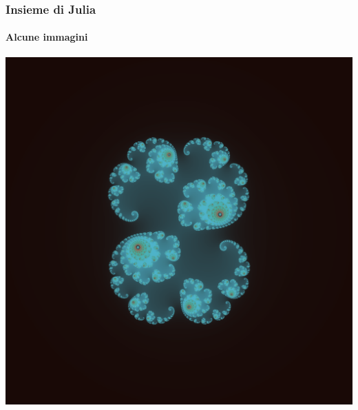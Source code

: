 \documentclass{beamer}
\begin{document}
			\begin{frame}
				\frametitle{Insieme di Julia}
				\framesubtitle{Alcune immagini}
				\begin{center}
					\includegraphics[width=0.7\linewidth]{"../Insieme di Julia/cosa52"}
				\end{center}
			\end{frame}
\end{document}
